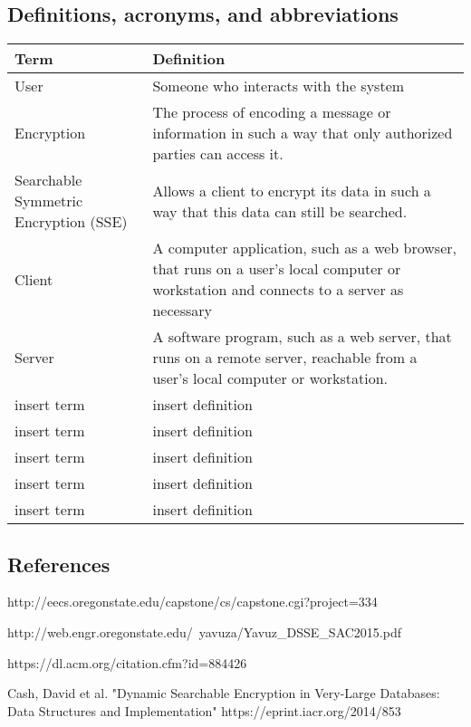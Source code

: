 \documentclass[onecolumn, draftclsnofoot,10pt, compsoc]{IEEEtran}
\begin{document}
\subsection{ Definitions, acronyms, and abbreviations }
    \begin{tabular}{| p{3.5cm} | p{12.5cm} |}
    \hline
	\textbf{Term} & \textbf{Definition} \\ \hline
    User & Someone who interacts with the system \\ \hline 
    Encryption & The process of encoding a message or information in such a way that only authorized parties can access it. \\ \hline
    Searchable Symmetric Encryption (SSE) & Allows a client to encrypt its data in such a way that this data can still be searched.  \\ \hline 
    Client & A computer application, such as a web browser, that runs on a user's local computer or workstation and connects to a server as 		necessary \\ \hline 
    Server &  A software program, such as a web server, that runs on a remote server, reachable from a user's local computer or workstation. \\ \hline 
    insert term & insert definition \\ \hline 
    insert term & insert definition \\ \hline 
    insert term & insert definition \\ \hline 
    insert term & insert definition \\ \hline 
    insert term & insert definition \\ \hline      
    \end{tabular}
\subsection{ References }
	\begin{enumerate}[label={[\arabic*]}, noitemsep]
    	\item http://eecs.oregonstate.edu/capstone/cs/capstone.cgi?project=334
        \item http://web.engr.oregonstate.edu/~yavuza/Yavuz\_DSSE\_SAC2015.pdf
        \item https://dl.acm.org/citation.cfm?id=884426
        \item Cash, David et al. "Dynamic Searchable Encryption in Very-Large Databases: Data Structures and Implementation" https://eprint.iacr.org/2014/853
	
	\end{enumerate}
\end{document}
